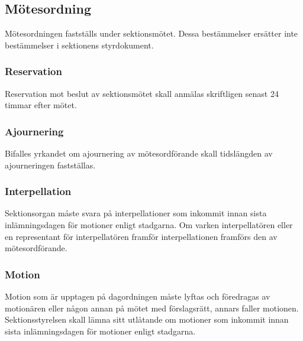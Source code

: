 \subsection{Mötesordning}
Mötesordningen fastställs under sektionsmötet. Dessa bestämmelser ersätter inte bestämmelser i sektionens styrdokument.

\subsubsection{Reservation}
Reservation mot beslut av sektionsmötet skall anmälas skriftligen senast 24 timmar efter mötet.

\subsubsection{Ajournering}
Bifalles yrkandet om ajournering av mötesordförande skall tidslängden av ajourneringen fastställas.

\subsubsection{Interpellation}
Sektionsorgan måste svara på interpellationer som inkommit innan sista inlämningsdagen för motioner enligt stadgarna. Om varken interpellatören eller en representant för interpellatören framför interpellationen framförs den av mötesordförande.

\subsubsection{Motion}
Motion som är upptagen på dagordningen måste lyftas och föredragas av motionären eller någon annan på mötet med förslagsrätt, annars faller motionen. Sektionsstyrelsen skall lämna sitt utlåtande om motioner som inkommit innan sista inlämningsdagen för motioner enligt stadgarna.

